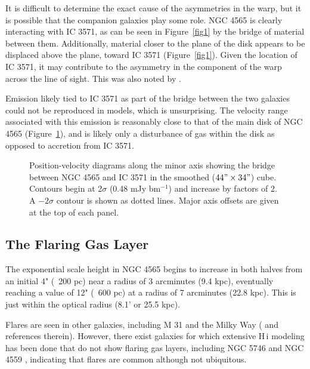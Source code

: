 \documentclass{emulateapj}
\begin{document}
\par
    It is difficult to determine the exact cause of the asymmetries in the warp, but it is possible that the companion galaxies play some role.  NGC 4565 is clearly interacting with IC 3571, as can be seen in Figure~\ref{fig1} by the bridge of material between them.  Additionally, material closer to the plane of the disk appears to be displaced above the plane, toward IC 3571 (Figure~\ref{fig1}).  Given the location of IC 3571, it may contribute to the asymmetry in the component of the warp across the line of sight. This was also noted by \citet{2005ASPC..331..139V}.

\par
     Emission likely tied to IC 3571 as part of the bridge between the two galaxies could not be reproduced in models, which is unsurprising.  The velocity range associated with this emission is reasonably close to that of the main disk of NGC 4565 (Figure~\ref{fig15}), and is likely only a disturbance of gas within the disk as opposed to accretion from IC 3571.

\begin{figure}
\caption{Position-velocity diagrams along the minor axis showing the bridge between NGC 4565 and IC 3571 in the smoothed ($44"\times34"$) cube.   Contours begin at 2$\sigma$ (0.48 mJy bm$^{-1}$) and increase by factors of 2. A $-2\sigma$ contour is shown as dotted lines. Major axis offsets are given at the top of each panel.\label{fig15}}
\end{figure}

\subsection{The Flaring Gas Layer} \label{Section6.2} 

\par
     The exponential scale height in NGC 4565 begins to increase in both halves from an initial 4" (~200 pc) near a radius of 3 arcminutes (9.4 kpc), eventually reaching a value of 12" (~600 pc) at a radius of 7 arcminutes (22.8 kpc).  This is just within the optical radius (8.1' or 25.5 kpc).   

\par
     Flares are seen in other galaxies, including M 31 \citep{1984A&A...141..195B} and the Milky Way (\citealt{2007A&A...469..511K} and references therein).  However, there exist galaxies for which extensive {\sc H\,i} modeling has been done that do not show flaring gas layers, including NGC 5746 \citep{2008ApJ...676..991R} and NGC 4559 \citep{2005A&A...439..947B}, indicating that flares are common although not ubiquitous.  
\end{document}
